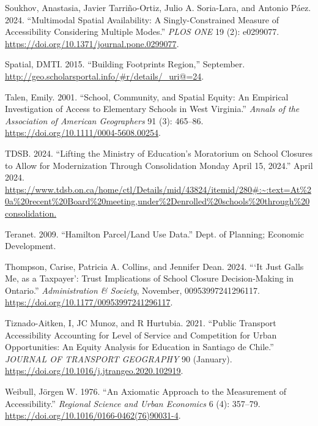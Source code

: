 \documentclass[
default
]{sn-jnl}
\newlength{\cslhangindent}
\newenvironment{CSLReferences}[2] %
 {\begin{list}{}{%
  \setlength{\itemindent}{0pt}
  \setlength{\leftmargin}{0pt}
  \setlength{\parsep}{0pt}
  \ifodd #1
   \setlength{\leftmargin}{\cslhangindent}
   \setlength{\itemindent}{-1\cslhangindent}
  \fi
  \setlength{\itemsep}{#2\baselineskip}}}
 {\end{list}}
\begin{document}
\begin{CSLReferences}{1}{0}
Soukhov, Anastasia, Javier Tarriño-Ortiz, Julio A. Soria-Lara, and
Antonio Páez. 2024. {``Multimodal Spatial Availability: A
Singly-Constrained Measure of Accessibility Considering Multiple
Modes.''} \emph{{PLOS} {ONE}} 19 (2): e0299077.
\url{https://doi.org/10.1371/journal.pone.0299077}.

Spatial, DMTI. 2015. {``Building Footprints Region,''} September.
\url{http://geo.scholarsportal.info/\#r/details/_uri@=24}.

Talen, Emily. 2001. {``School, Community, and Spatial Equity: An
Empirical Investigation of Access to Elementary Schools in West
Virginia.''} \emph{Annals of the Association of American Geographers} 91
(3): 465--86. \url{https://doi.org/10.1111/0004-5608.00254}.

TDSB. 2024. {``Lifting the Ministry of Education's Moratorium on School
Closures to Allow for Modernization Through Consolidation Monday April
15, 2024.''} April 2024.
\url{https://www.tdsb.on.ca/home/ctl/Details/mid/43824/itemid/280\#:~:text=At\%20a\%20recent\%20Board\%20meeting,under\%2Denrolled\%20schools\%20through\%20consolidation.}

Teranet. 2009. {``Hamilton Parcel/Land Use Data.''} Dept. of Planning;
Economic Development.

Thompson, Carise, Patricia A. Collins, and Jennifer Dean. 2024. {``{`It
Just Galls Me, as a Taxpayer'}: Trust Implications of School Closure
Decision-Making in Ontario.''} \emph{Administration \& Society},
November, 00953997241296117.
\url{https://doi.org/10.1177/00953997241296117}.

Tiznado-Aitken, I, JC Munoz, and R Hurtubia. 2021. {``Public Transport
Accessibility Accounting for Level of Service and Competition for Urban
Opportunities: An Equity Analysis for Education in Santiago de Chile.''}
\emph{{JOURNAL} {OF} {TRANSPORT} {GEOGRAPHY}} 90 (January).
\url{https://doi.org/10.1016/j.jtrangeo.2020.102919}.

Weibull, Jörgen W. 1976. {``An Axiomatic Approach to the Measurement of
Accessibility.''} \emph{Regional Science and Urban Economics} 6 (4):
357--79. \url{https://doi.org/10.1016/0166-0462(76)90031-4}.


\end{CSLReferences}
\end{document}
